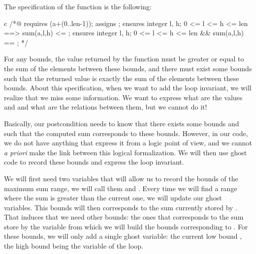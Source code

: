 The specification of the function is the following:



\begin{CodeBlock}{c}
/*@ 
  requires \valid(a+(0..len-1));
  assigns \nothing;
  ensures \forall integer l, h;  0 <= l <= h <= len ==> sum(a,l,h) <= \result;
  ensures \exists integer l, h;  0 <= l <= h <= len &&  sum(a,l,h) == \result;
*/
\end{CodeBlock}



For any bounds, the value returned by the function must be greater or
equal to the sum of the elements between these bounds, and there must
exist some bounds such that the returned value is exactly the sum of the
elements between these bounds. About this specification, when we want to
add the loop invariant, we will realize that we miss some information.
We want to express what are the values  and  and
what are the relations between them, but we cannot do it!

Basically, our postcondition needs to know that there exists some bounds
 and  such that the computed sum corresponds to
these bounds. However, in our code, we do not have anything that express
it from a logic point of view, and we cannot \emph{a priori} make the
link between this logical formalization. We will then use ghost code to
record these bounds and express the loop invariant.

We will first need two variables that will allow us to record the bounds
of the maximum sum range, we will call them  and
. Every time we will find a range where the sum is greater
than the current one, we will update our ghost variables. This bounds
will then corresponds to the sum currently stored by . That
induces that we need other bounds: the ones that corresponds to the sum
store by the variable  from which we will build the bounds
corresponding to . For these bounds, we will only add a
single ghost variable: the current low bound , the high
bound being the variable  of the loop.



